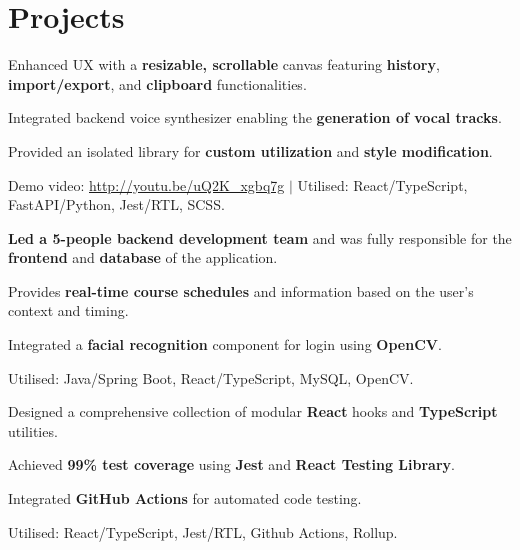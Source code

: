 \documentclass[a4paper,10pt]{article}
\begin{document}
\section{Projects}

\begin{tightitemize}
  \item Enhanced UX with a \textbf{resizable, scrollable} canvas featuring \textbf{history}, \textbf{import/export}, and \textbf{clipboard} functionalities.
  \item Integrated backend voice synthesizer enabling the \textbf{generation of vocal tracks}.
  \item Provided an isolated library for \textbf{custom utilization} and \textbf{style modification}.
  \item Demo video: \href{http://youtu.be/uQ2K\_xgbq7g}{\underline{http://youtu.be/uQ2K\_xgbq7g}} $|$ Utilised: React/TypeScript, FastAPI/Python, Jest/RTL, SCSS.
\end{tightitemize}

\begin{tightitemize}
  \item \textbf{Led a 5-people backend development team} and was fully responsible for the \textbf{frontend} and \textbf{database} of the application.
  \item Provides \textbf{real-time course schedules} and information based on the user's context and timing.
  \item Integrated a \textbf{facial recognition} component for login using \textbf{OpenCV}.
  \item Utilised: Java/Spring Boot, React/TypeScript, MySQL, OpenCV.
\end{tightitemize}

\begin{tightitemize}
  \item Designed a comprehensive collection of modular \textbf{React} hooks and \textbf{TypeScript} utilities.
  \item Achieved \textbf{99\% test coverage} using \textbf{Jest} and \textbf{React Testing Library}.
  \item Integrated \textbf{GitHub Actions} for automated code testing.
  \item Utilised: React/TypeScript, Jest/RTL, Github Actions, Rollup.
\end{tightitemize}
\end{document}
